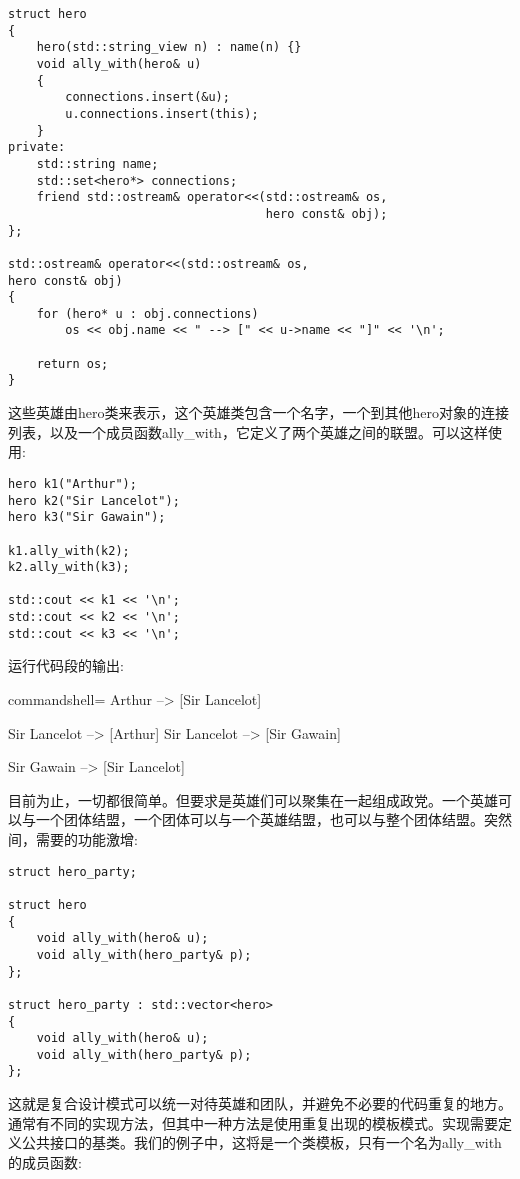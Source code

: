\begin{lstlisting}[style=styleCXX]
struct hero
{
	hero(std::string_view n) : name(n) {}
	void ally_with(hero& u)
	{
		connections.insert(&u);
		u.connections.insert(this);
	}
private:
	std::string name;
	std::set<hero*> connections;
	friend std::ostream& operator<<(std::ostream& os,
									hero const& obj);
};

std::ostream& operator<<(std::ostream& os,
hero const& obj)
{
	for (hero* u : obj.connections)
		os << obj.name << " --> [" << u->name << "]" << '\n';

	return os;
}
\end{lstlisting}

这些英雄由hero类来表示，这个英雄类包含一个名字，一个到其他hero对象的连接列表，以及一个成员函数ally\_with，它定义了两个英雄之间的联盟。可以这样使用:

\begin{lstlisting}[style=styleCXX]
hero k1("Arthur");
hero k2("Sir Lancelot");
hero k3("Sir Gawain");

k1.ally_with(k2);
k2.ally_with(k3);

std::cout << k1 << '\n';
std::cout << k2 << '\n';
std::cout << k3 << '\n';
\end{lstlisting}

运行代码段的输出:

\begin{tcblisting}{commandshell={}}
Arthur --> [Sir Lancelot]

Sir Lancelot --> [Arthur]
Sir Lancelot --> [Sir Gawain]

Sir Gawain --> [Sir Lancelot]
\end{tcblisting}

目前为止，一切都很简单。但要求是英雄们可以聚集在一起组成政党。一个英雄可以与一个团体结盟，一个团体可以与一个英雄结盟，也可以与整个团体结盟。突然间，需要的功能激增:

\begin{lstlisting}[style=styleCXX]
struct hero_party;

struct hero
{
	void ally_with(hero& u);
	void ally_with(hero_party& p);
};

struct hero_party : std::vector<hero>
{
	void ally_with(hero& u);
	void ally_with(hero_party& p);
};
\end{lstlisting}

这就是复合设计模式可以统一对待英雄和团队，并避免不必要的代码重复的地方。通常有不同的实现方法，但其中一种方法是使用重复出现的模板模式。实现需要定义公共接口的基类。我们的例子中，这将是一个类模板，只有一个名为ally\_with的成员函数:

